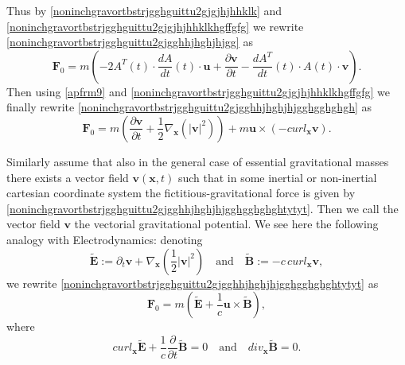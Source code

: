 \documentclass{article}
\theoremstyle{definition}
\theoremstyle{remark}
\renewcommand{\vec}[1]{\mathbf{#1}}
\newcommand{\er}{\eqref}
\newcommand{\er}{\eqref}
\begin{document}
Thus by \er{noninchgravortbstrjgghguittu2gjgjhjhhklk} and
\er{noninchgravortbstrjgghguittu2gjgjhjhhklkhgffgfg} we rewrite
\er{noninchgravortbstrjgghguittu2gjgghhjhghjhjgg} as
\begin{equation}\label{noninchgravortbstrjgghguittu2gjgghhjhghjhjgghgghghgh}
\vec F_0=m\left(-2A^T(t)\cdot\frac{dA}{dt}(t)\cdot\vec
u+\frac{\partial\vec v}{\partial t}-\frac{dA^T}{dt}(t)\cdot
A(t)\cdot \vec v\right).
\end{equation}
Then using \er{apfrm9} and
\er{noninchgravortbstrjgghguittu2gjgjhjhhklkhgffgfg} we finally
rewrite \er{noninchgravortbstrjgghguittu2gjgghhjhghjhjgghgghghgh} as
\begin{equation}\label{noninchgravortbstrjgghguittu2gjgghhjhghjhjgghgghghghtytyt}
\vec F_0=m\left(\frac{\partial\vec v}{\partial
t}+\frac{1}{2}\nabla_{\vec x}\left(|\vec v|^2\right)\right)+m\vec
u\times \left(-curl_{\vec x}\vec v\right).
\end{equation}





 Similarly assume that also in the general case of essential
gravitational masses there exists a vector field $\vec v(\vec x,t)$
such that in some inertial or non-inertial cartesian coordinate
system the fictitious-gravitational force is given by
\er{noninchgravortbstrjgghguittu2gjgghhjhghjhjgghgghghghtytyt}. Then
we call the vector field $\vec v$ the vectorial gravitational
potential. We see here the following analogy with Electrodynamics:
denoting
\begin{equation*}
\tilde {\vec E}:=\partial_{t}\vec v+\nabla_{\vec
x}\left(\frac{1}{2}|\vec v|^2\right)\quad\text{and}\quad \tilde
{\vec B}:=-c\, curl_{\vec x}\vec v,
\end{equation*}
we rewrite
\er{noninchgravortbstrjgghguittu2gjgghhjhghjhjgghgghghghtytyt} as
\begin{equation}\label{MaxVacFull1ninshtrgravortjhhjfhfhNewhjh}
\vec F_0=m\left(\tilde {\vec E}+\frac{1}{c}\vec u\times\tilde {\vec
B}\right),
\end{equation}
where
\begin{equation*}
curl_{\vec x}\tilde {\vec E}+\frac{1}{c}\frac{\partial}{\partial
t}\tilde {\vec B}=0\quad\text{and}\quad div_{\vec x}\tilde {\vec
B}=0.
\end{equation*}
\end{document}
